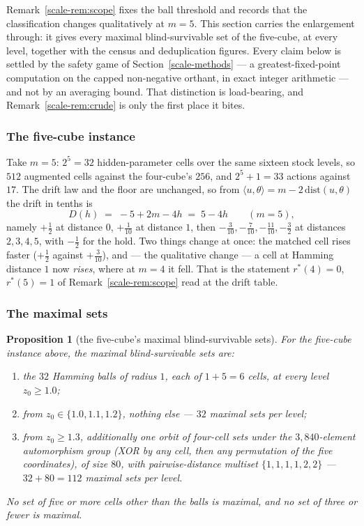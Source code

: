 \documentclass[10pt,twocolumn]{article}
\theoremstyle{plain}
\newtheorem{proposition}[theorem]{Proposition}
\theoremstyle{definition}
\theoremstyle{remark}
\begin{document}
Remark~\ref{scale-rem:scope} fixes the ball threshold and records that the classification changes
qualitatively at \(m = 5\). This section carries the enlargement through: it gives every
maximal blind-survivable set of the five-cube, at every level, together with the census and
deduplication figures. Every claim below is settled by the safety game of
Section~\ref{scale-methods} --- a greatest-fixed-point computation on the capped non-negative
orthant, in exact integer arithmetic --- and not by an averaging bound. That distinction is
load-bearing, and Remark~\ref{scale-rem:crude} is only the first place it bites.

\subsubsection{The five-cube instance}

Take \(m = 5\): \(2^{5} = 32\) hidden-parameter cells over the same sixteen stock levels, so
\(512\) augmented cells against the four-cube's \(256\), and \(2^{5} + 1 = 33\) actions
against \(17\). The drift law and the floor are unchanged, so from
\(\langle u, \theta\rangle = m - 2\,\mathrm{dist}(u,\theta)\) the drift in tenths is
\[
D(h) \;=\; -5 + 2m - 4h \;=\; 5 - 4h \qquad (m = 5),
\]
namely \(+\tfrac12\) at distance \(0\), \(+\tfrac1{10}\) at distance \(1\), then
\(-\tfrac3{10}, -\tfrac7{10}, -\tfrac{11}{10}, -\tfrac32\) at distances \(2,3,4,5\), with
\(-\tfrac12\) for the hold. Two things change at once: the matched cell rises faster
(\(+\tfrac12\) against \(+\tfrac3{10}\)), and --- the qualitative change --- a cell at
Hamming distance \(1\) now \emph{rises}, where at \(m = 4\) it fell. That is the statement
\(r^{*}(4) = 0\), \(r^{*}(5) = 1\) of Remark~\ref{scale-rem:scope} read at the drift table.

\subsubsection{The maximal sets}

\begin{proposition}[the five-cube's maximal blind-survivable sets]
\label{scale-prop:five}
For the five-cube instance above, the maximal blind-survivable sets are:
\begin{enumerate}
\item the \(32\) Hamming balls of radius \(1\), each of \(1 + 5 = 6\) cells, at \emph{every}
level \(z_{0} \ge 1.0\);
\item from \(z_{0} \in \{1.0, 1.1, 1.2\}\), \emph{nothing else} --- \(32\) maximal sets per
level;
\item from \(z_{0} \ge 1.3\), additionally one orbit of four-cell sets under the
\(3{,}840\)-element automorphism group (XOR by any cell, then any permutation of the five
coordinates), of size \(80\), with pairwise-distance multiset \(\{1,1,1,1,2,2\}\) ---
\(32 + 80 = 112\) maximal sets per level.
\end{enumerate}
No set of five or more cells other than the balls is maximal, and no set of three or fewer
is maximal.
\end{proposition}
\end{document}
